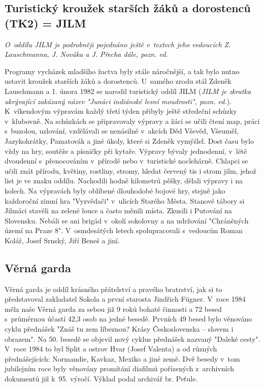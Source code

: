 \documentclass[a5paper, 12pt, twoside]{article}
\begin{document}
\subsection{Turistický kroužek starších žáků a dorostenců (TK2) =
JILM}

\textit{O~oddílu JILM je podrobněji pojednáno ještě v~textech jeho
vedoucích Z. Lauschmanna, J. Nováka a J. Přecha dále, pozn. ed.}

Programy vycházek mladšího žactva byly stále náročnější, a tak bylo
nutno ustavit kroužek starších žáků a dorostenců. U~samého zrodu stál
Zdeněk Lauschmann a 1. února 1982 se narodil turistický oddíl JILM
(\textit{JILM je zkratka ukrývající zakázaný název "Junáci indiánské lesní moudrosti", pozn. ed.}). K~víkendovým výpravám každý třetí týden
přibyly ještě středeční schůzky v~klubovně. Na schůzkách se připravovaly
výpravy a žáci se učili čtení map, práci s~buzolou, uzlování, vzdělávali
se nenásilně v~akcích Děd Vševěd, Všeuměl, Jazykohrátky, Pamatovák a
jiné úkoly, které si Zdeněk vymýšlel. Dost času bylo vždy na hry,
soutěže a písničky při kytaře. Výpravy bývaly jednodenní, v~létě
dvoudenní s~přenocováním v~přírodě nebo v~turistické noclehárně. Chlapci
se učili znát přírodu, květiny, rostliny, stromy, hledat červený tis i
strom jilm, jehož list je ve znaku oddílu. Nachodili hodně kilometrů
pěšky, dělali výpravy i na kolech. Na výpravách byly oblíbené dlouhodobé
bojové hry, stejně jako každoroční zimní hra "Vyzvědači" v~ulicích
Starého Města. Stanové tábory si Jilmáci stavěli na zelené louce a často
měnili místa. Zkusili i Putování na Slovensku. Nebáli se ani brigád
v~okolí sokolovny a na udržování "Chráněných území na Praze 8".
V~osmdesátých letech spolupracovali s~vedoucím Roman Kolář, Josef Srnský,
Jiří Beneš a jiní.

\subsection{Věrná garda}

Věrná garda je oddíl krásného přátelství a pravého bratrství, jak si to
představoval zakladatel Sokola a první starosta Jindřich Fügner. V~roce
1984 měla naše Věrná garda za sebou již 9 roků bohaté činnosti a 72
besed s~průměrnou účastí 42,3 osob na jedné besedě. Prvních 49 besed
bylo věnováno cyklu přednášek "Znáš tu zem líbeznou? Krásy
Československa -- slovem i obrazem". Na 50. besedě se objevil nový
cyklus přednášek nazvaný "Daleké cesty". V~roce 1984 to byl Split a
ostrov Hvar (Josef Valenta) a od různých přednášejících: Normandie,
Kavkaz, Mexiko a jiné země. Dvě besedy v~tom jubilejním roce byly
věnovány promítání diafilmů pořízených z~archivních dokumentů již k~95.
výročí. Výklad podal archivář br. Peťule.
\end{document}
